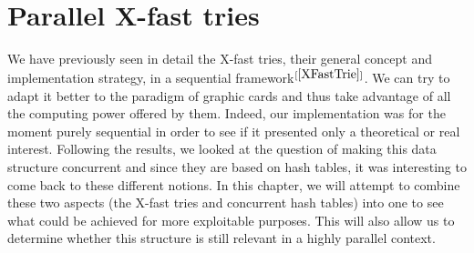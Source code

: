 
\chapter{Parallel X-fast tries}\label{PARALLELXFASTTRIE}

We have previously seen in detail the X-fast tries, their general concept and implementation strategy, in a sequential framework$^{[\ref{XFastTrie}]}$. We can try to adapt it better to the paradigm of graphic cards and thus take advantage of all the computing power offered by them. Indeed, our implementation was for the moment purely sequential in order to see if it presented only a theoretical or real interest. Following the results, we looked at the question of making this data structure concurrent and since they are based on hash tables, it was interesting to come back to these different notions. In this chapter, we will attempt to combine these two aspects (the X-fast tries and concurrent hash tables) into one to see what could be achieved for more exploitable purposes. This will also allow us to determine whether this structure is still relevant in a highly parallel context.

















